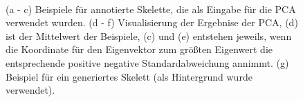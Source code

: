 \begin{figure}
  \\
  
  \caption{(a - c) Beispiele für annotierte Skelette, die als Eingabe für die PCA verwendet wurden. (d - f) Visualisierung der Ergebnise der PCA, (d) ist der Mittelwert der Beispiele, (c) und (e) entstehen jeweils, wenn die Koordinate für den Eigenvektor zum größten Eigenwert die entsprechende positive \bzw negative Standardabweichung annimmt. (g) Beispiel für ein generiertes Skelett (als Hintergrund wurde \cite{background} verwendet).}
  \label{intro_pic}
 \end{figure}



